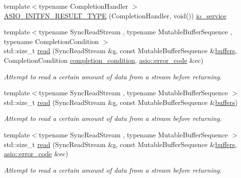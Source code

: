 \begin{DoxyCompactItemize}
\item 
{\footnotesize template$<$typename Completion\+Handler $>$ }\\\hyperlink{namespaceasio_a2d02e61810aed938d944fa2dae09d66c}{A\+S\+I\+O\+\_\+\+I\+N\+I\+T\+F\+N\+\_\+\+R\+E\+S\+U\+L\+T\+\_\+\+T\+Y\+P\+E} (Completion\+Handler, void()) \hyperlink{classasio_1_1io__service}{io\+\_\+service}
\item 
{\footnotesize template$<$typename Sync\+Read\+Stream , typename Mutable\+Buffer\+Sequence , typename Completion\+Condition $>$ }\\std\+::size\+\_\+t \hyperlink{group__read_ga68b2bc31177c2bf7cba974b5c65f9036}{read} (Sync\+Read\+Stream \&\hyperlink{group__async__connect_ga31ab74b9ea6c77932dddd016cfc7920a}{s}, const Mutable\+Buffer\+Sequence \&\hyperlink{group__async__read_ga54dede45c3175148a77fe6635222c47d}{buffers}, Completion\+Condition \hyperlink{group__async__read_gae2e215d5013596cc2b385bb6c13fa518}{completion\+\_\+condition}, \hyperlink{classasio_1_1error__code}{asio\+::error\+\_\+code} \&ec)
\begin{DoxyCompactList}\small\item\em Attempt to read a certain amount of data from a stream before returning. \end{DoxyCompactList}\item 
{\footnotesize template$<$typename Sync\+Read\+Stream , typename Mutable\+Buffer\+Sequence $>$ }\\std\+::size\+\_\+t \hyperlink{group__read_ga9c82bf41e199a1c6a5e1c19dbb79d4f8}{read} (Sync\+Read\+Stream \&\hyperlink{group__async__connect_ga31ab74b9ea6c77932dddd016cfc7920a}{s}, const Mutable\+Buffer\+Sequence \&\hyperlink{group__async__read_ga54dede45c3175148a77fe6635222c47d}{buffers})
\begin{DoxyCompactList}\small\item\em Attempt to read a certain amount of data from a stream before returning. \end{DoxyCompactList}\item 
{\footnotesize template$<$typename Sync\+Read\+Stream , typename Mutable\+Buffer\+Sequence $>$ }\\std\+::size\+\_\+t \hyperlink{group__read_ga96a4f3670e5250b6f8703337b583f1c9}{read} (Sync\+Read\+Stream \&\hyperlink{group__async__connect_ga31ab74b9ea6c77932dddd016cfc7920a}{s}, const Mutable\+Buffer\+Sequence \&\hyperlink{group__async__read_ga54dede45c3175148a77fe6635222c47d}{buffers}, \hyperlink{classasio_1_1error__code}{asio\+::error\+\_\+code} \&ec)
\begin{DoxyCompactList}\small\item\em Attempt to read a certain amount of data from a stream before returning. \end{DoxyCompactList}\item 

\end{DoxyCompactItemize}
